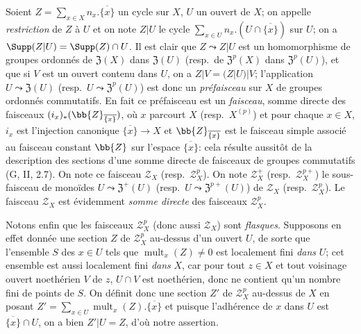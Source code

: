 \begin{env}[21.6.3]
Soient $Z=\sum_{x\in X}n_x.\overline{\{x\}}$ un cycle sur $X$, $U$ un ouvert de $X$;
on appelle \emph{restriction} de $Z$ à $U$ et on note $Z|U$ le cycle $\sum_{x\in U}n_x.(U\cap\overline{\{x\}})$ sur $U$;
on a $\Supp(Z|U)=\Supp(Z)\cap U$.
Il est clair que $Z\leadsto Z|U$ est un homomorphisme de groupes ordonnés de $\mathfrak{Z}(X)$ dans $\mathfrak{Z}(U)$ (resp.\ de $\mathfrak{Z}^p(X)$ dans $\mathfrak{Z}^p(U)$), et que si $V$ est un ouvert contenu dans $U$, on a $Z|V=(Z|U)|V$;
l'application $U\leadsto\mathfrak{Z}(U)$ (resp.\ $U\leadsto\mathfrak{Z}^p(U)$) est donc un \emph{préfaisceau} sur $X$ de groupes ordonnés commutatifs.
En fait ce préfaisceau est un \emph{faisceau}, somme directe des faisceaux $(i_x)_*(\bb{Z}_{\overline{\{x\}}})$, où $x$ parcourt $X$ (resp.\ $X^{(p)}$) et pour chaque $x\in X$, $i_x$ est l'injection canonique $\overline{\{x\}}\to X$ et $\bb{Z}_{\overline{\{x\}}}$ est le faisceau simple associé au faisceau constant $\bb{Z}$ sur l'espace $\overline{\{x\}}$:
cela résulte aussitôt de la description des sections d'une somme directe de faisceaux de groupes commutatifs (G, II, 2.7).
On note ce faisceau $\mathscr{Z}_X$ (resp.\ $\mathscr{Z}_X^p$).
On note $\mathscr{Z}_X^+$ (resp.\ $\mathscr{Z}_X^{p+}$) le sous-faisceau
de monoïdes $U\leadsto\mathfrak{Z}^+(U)$ (resp.\ $U\leadsto\mathfrak{Z}^{p+}(U)$) de $\mathscr{Z}_X$ (resp.\ $\mathscr{Z}_X^p$).
Le faisceau $\mathscr{Z}_X$ est évidemment \emph{somme directe} des faisceaux $\mathscr{Z}_X^p$.

Notons enfin que les faisceaux $\mathscr{Z}_X^p$ (donc aussi $\mathscr{Z}_X$) sont \emph{flasques}.
Supposons en effet donnée une section $Z$ de $\mathscr{Z}_X^p$ au-dessus d'un ouvert $U$, de sorte que l'ensemble $S$ des $x\in U$ tels que $\operatorname{mult}_x(Z)\neq0$ est localement fini \emph{dans} $U$;
cet ensemble est aussi localement fini \emph{dans} $X$, car pour tout $z\in X$ et tout voisinage ouvert noethérien $V$ de $z$, $U\cap V$ est noethérien, donc ne contient qu'un nombre fini de points de $S$.
On définit donc une section $Z'$ de $\mathscr{Z}_X^p$ au-dessus de $X$ en posant $Z'=\sum_{x\in U}\operatorname{mult}_x(Z).\overline{\{x\}}$ et puisque l'adhérence de $x$ dans $U$ est $\overline{\{x\}}\cap U$, on a bien $Z'|U=Z$, d'où notre assertion.
\end{env}

